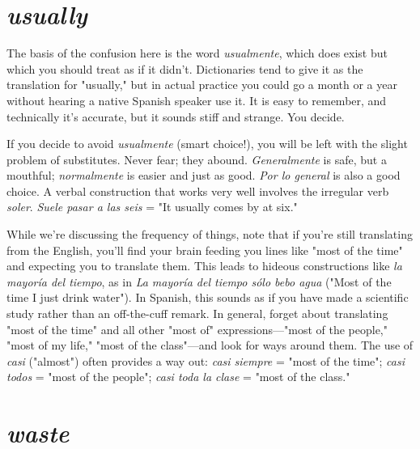 \section{\emph{usually}}

The basis of the confusion here is the word \emph{usualmente},
which does exist but which you should treat as if it didn't. Dictionaries tend to give it as the translation for "usually," but in actual practice you could go a month or a year without hearing a native Spanish
speaker use it. It is easy to remember, and technically it's accurate, but
it sounds stiff and strange. You decide.

If you decide to avoid \emph{usualmente} (smart choice!), you will be
left with the slight problem of substitutes. Never fear; they abound.
\emph{Generalmente} is safe, but a mouthful; \emph{normalmente} is easier and just
as good. \emph{Por lo general} is also a good choice. A verbal construction that
works very well involves the irregular verb \emph{soler}. \emph{Suele pasar a las seis}
= "It usually comes by at six."

While we're discussing the frequency of things, note that if
you're still translating from the English, you'll find your brain feeding
you lines like "most of the time" and expecting you to translate them.
This leads to hideous constructions like \emph{la mayoría del tiempo}, as in
\emph{La mayoría del tiempo sólo bebo agua} ("Most of the time I just drink
water"). In Spanish, this sounds as if you have made a scientific study
rather than an off-the-cuff remark. In general, forget about translating
"most of the time" and all other "most of" expressions---"most of the
people," "most of my life," "most of the class"---and look for ways
around them. The use of \emph{casi} ("almost") often provides a way out: \emph{casi
siempre} = "most of the time"; \emph{casi todos} = "most of the people";
\emph{casi toda la clase} = "most of the class."

\section{\emph{waste}}

